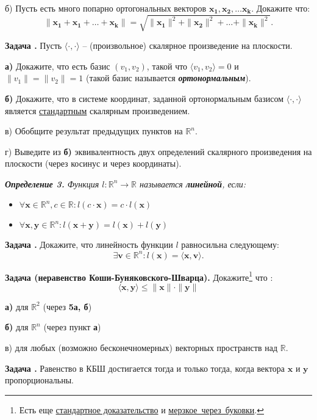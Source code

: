 \documentclass[12pt,a4paper]{article}
\def\R{\mathbb{R}}
\newcounter{znum}
\newcommand{\zz}[1]{\addtocounter{znum}{1} \textbf{Задача \arabic{znum}#1. }}
\begin{document}
б) Пусть есть много попарно ортогональных векторов $\mathbf{x_1}, \mathbf{x_2}, \ldots \mathbf{x_k}$. Докажите что: $$\|\mathbf{x_1} + \mathbf{x_1} + \ldots + \mathbf{x_k}\| = \sqrt{\|\mathbf{x_1}\|^2 + \|\mathbf{x_2}\|^2 + \ldots + \|\mathbf{x_k}\|^2}. $$

\zz{} Пусть $\langle \cdot , \cdot \rangle$ -- (произвольное) скалярное произведение на плоскости. \par
\textbf{а)} Докажите, что есть базис $(v_1, v_2)$, такой что $\langle v_1, v_2 \rangle = 0$ и $\|v_1\| = \|v_2\| = 1$ (такой базис называется {\it \textbf{ортонормальным}}).\par
\textbf{б)} Докажите, что в системе координат, заданной ортонормальным базисом  $\langle \cdot , \cdot \rangle$ является \underline{стандартным} скалярным произведением.\par
в) Обобщите результат предыдущих пунктов на $\R^n$.\par
г) Выведите из \textbf{б)} эквивалентность двух определений скалярного произведения на плоскости (через косинус и через координаты).

{\it \textbf{Определение 3.} Функция $l: \R^ n \to \R$ называется \textbf{линейной}, если:
	\begin{itemize}
		\item $\forall \mathbf{x} \in \R^n, c \in \R : l(c \cdot \mathbf{x}) = c \cdot l(\mathbf{x})$
		\item $\forall \mathbf{x}, \mathbf{y} \in \R^n : l(\mathbf{x} + \mathbf{y}) = l(\mathbf{x}) + l(\mathbf{y})$
	\end{itemize}
}

\zz{} Докажите, что линейность функции $l$ равносильна следующему:
$$ \exists \mathbf{v} \in \R^n : l(\mathbf{x}) = \langle \mathbf{x}, \mathbf{v}\rangle.$$


\zz{ (неравенство Коши-Буняковского-Шварца)} Докажите\footnote{
	Есть еще \href{https://ru.wikipedia.org/wiki/\%D0\%9D\%D0\%B5\%D1\%80\%D0\%B0\%D0\%B2\%D0\%B5\%D0\%BD\%D1\%81\%D1\%82\%D0\%B2\%D0\%BE\_\%D0\%9A\%D0\%BE\%D1\%88\%D0\%B8\_\%E2\%80\%94\_\%D0\%91\%D1\%83\%D0\%BD\%D1\%8F\%D0\%BA\%D0\%BE\%D0\%B2\%D1\%81\%D0\%BA\%D0\%BE\%D0\%B3\%D0\%BE\#\%D0\%94\%D0\%BE\%D0\%BA\%D0\%B0\%D0\%B7\%D0\%B0\%D1\%82\%D0\%B5\%D0\%BB\%D1\%8C\%D1\%81\%D1\%82\%D0\%B2\%D0\%BE}{стандартное доказательство} и 
	\href{https://zftsh.online/public/folder\_attachment/a0/a9/a8f7\_061b.pdf?c=006f}{мерзкое~через~буковки}.} что :
$$ \langle \mathbf{x}, \mathbf{y} \rangle  \leqslant \|\mathbf{x}\| \cdot \|\mathbf{y}\|$$\par
\textbf{а)} для $\R^2$ (через \textbf{5а, б})\par
\textbf{б)} для $\R^n$ (через пункт \textbf{а})\par
в) для любых (возможно бесконечномерных) векторных пространств над $\R$.\par
\zz{} Равенство в КБШ достигается тогда и только тогда, когда вектора $\mathbf{x}$ и $\mathbf{y}$ пропорциональны.
\end{document}

